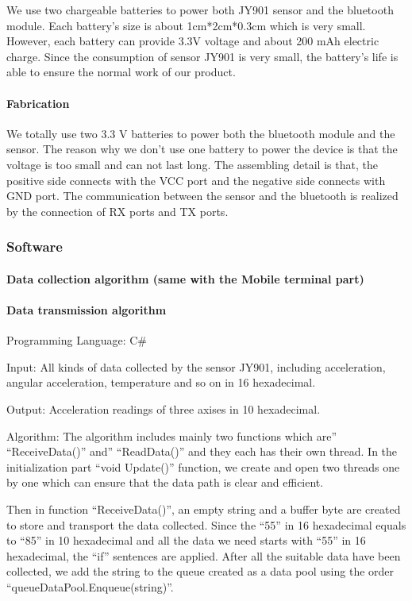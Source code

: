We use two chargeable batteries to power both JY901 sensor and the bluetooth
module. Each battery’s size is about 1cm*2cm*0.3cm which is very small. However,
each battery can provide 3.3V voltage and about 200 mAh electric charge. Since
the consumption of sensor JY901 is very small, the battery’s life is able to
ensure the normal work of our product. 


\paragraph{Fabrication}

We totally use two 3.3 V batteries to power both the bluetooth module and the
sensor. The reason why we don’t use one battery to power the device is that the
voltage is too small and can not last long. The assembling detail is that, the
positive side connects with the VCC port and the negative side connects with GND
port. The communication between the sensor and the bluetooth is realized by the
connection of RX ports and TX ports.  

\subsubsection{Software}
\paragraph{Data collection algorithm (same with the Mobile terminal part)}
\paragraph{Data transmission algorithm}

Programming Language: C\#

Input: All kinds of data collected by the sensor JY901, including acceleration,
angular acceleration, temperature and so on in 16 hexadecimal.   

Output: Acceleration readings of three axises in 10 hexadecimal. 

Algorithm: The algorithm includes mainly two functions which are''
``ReceiveData()'' and'' ``ReadData()'' and they each has their own thread. In
the initialization part “void Update()” function, we create and open two threads
one by one which can ensure that the data path is clear and efficient. 

Then in function ``ReceiveData()'', an empty string and a buffer byte are
created to store and transport the data collected. Since the “55” in 16
hexadecimal equals to “85” in 10 hexadecimal and all the data we need starts
with “55” in 16 hexadecimal, the “if” sentences are applied. After all the
suitable data have been collected, we add the string to the queue created as a
data pool using the order “queueDataPool.Enqueue(string)”. 

